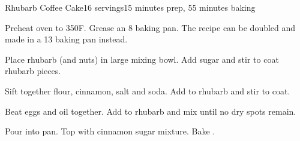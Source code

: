 \documentclass[../Cookbook.tex]{subfiles}
\begin{document}
\begin{recipe}{Rhubarb Coffee Cake}{16 servings}{15 minutes prep, 55 minutes baking}

	Preheat oven to 350\0F. Grease an 8 baking pan. The recipe can be doubled and made in a 13 baking pan instead.

	Place rhubarb (and nuts) in large mixing bowl.  Add sugar and stir to coat rhubarb pieces.

	Sift together flour, cinnamon, salt and soda.  Add to rhubarb and stir to coat.

	Beat eggs and oil together.  Add to rhubarb and mix until no dry spots remain.

	Pour into pan. Top with cinnamon sugar mixture. Bake .
\end{recipe}
\end{document}
